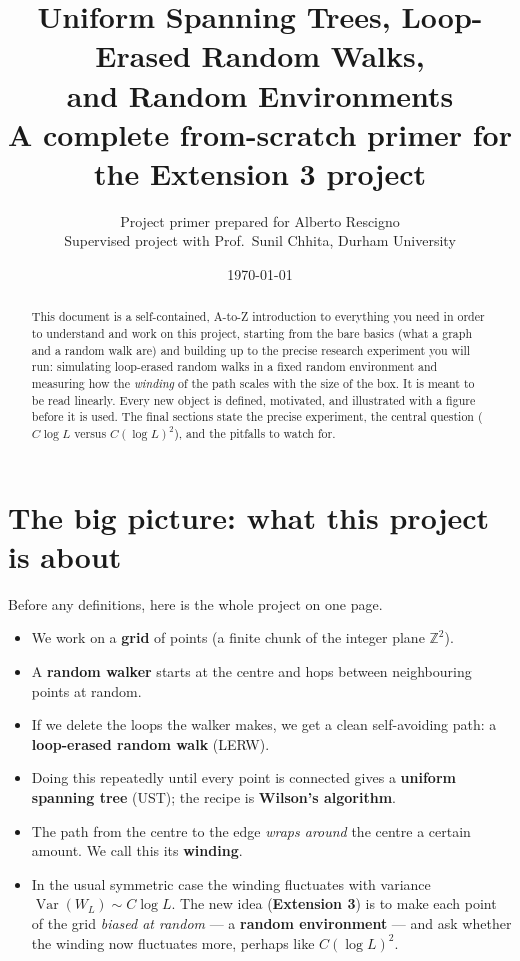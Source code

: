 \documentclass[11pt]{article}
\title{\bfseries Uniform Spanning Trees, Loop-Erased Random Walks,\\
and Random Environments\\[4pt]
\large A complete from-scratch primer for the Extension 3 project}
\author{Project primer prepared for Alberto Rescigno\\
\small Supervised project with Prof.\ Sunil Chhita, Durham University}
\date{\today}
\theoremstyle{definition}
\theoremstyle{plain}
\newcommand{\Z}{\mathbb{Z}}
\newcommand{\Var}{\operatorname{Var}}
\newcommand{\Wind}{W_{L}}
\begin{document}
\maketitle

\begin{abstract}
\noindent
This document is a self-contained, A-to-Z introduction to everything you need
in order to understand and work on this project, starting from the bare basics
(what a graph and a random walk are) and building up to the precise research
experiment you will run: simulating loop-erased random walks in a fixed random
environment and measuring how the \emph{winding} of the path scales with the
size of the box. It is meant to be read linearly. Every new object is defined,
motivated, and illustrated with a figure before it is used. The final sections
state the precise experiment, the central question
($C\log L$ versus $C(\log L)^2$), and the pitfalls to watch for.
\end{abstract}

\tableofcontents
\bigskip

\section{The big picture: what this project is about}

Before any definitions, here is the whole project on one page.

\begin{itemize}[leftmargin=1.4em]
  \item We work on a \textbf{grid} of points (a finite chunk of the integer
        plane $\Z^2$).
  \item A \textbf{random walker} starts at the centre and hops between
        neighbouring points at random.
  \item If we delete the loops the walker makes, we get a clean
        self-avoiding path: a \textbf{loop-erased random walk} (LERW).
  \item Doing this repeatedly until every point is connected gives a
        \textbf{uniform spanning tree} (UST); the recipe is
        \textbf{Wilson's algorithm}.
  \item The path from the centre to the edge \emph{wraps around} the centre
        a certain amount. We call this its \textbf{winding}.
  \item In the usual symmetric case the winding fluctuates with variance
        $\Var(\Wind)\sim C\log L$. The new idea (\textbf{Extension 3}) is to
        make each point of the grid \emph{biased at random} --- a
        \textbf{random environment} --- and ask whether the winding now
        fluctuates more, perhaps like $C(\log L)^2$.
\end{itemize}
\end{document}
